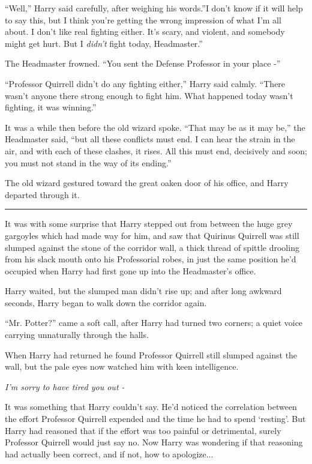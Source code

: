``Well,'' Harry said carefully, after weighing his words.''I don't know
if it will help to say this, but I think you're getting the wrong
impression of what I'm all about. I don't like real fighting either.
It's scary, and violent, and somebody might get hurt. But I
\emph{didn't} fight today, Headmaster.''

The Headmaster frowned. ``You sent the Defense Professor in your place
-''

``Professor Quirrell didn't do any fighting either,'' Harry said calmly.
``There wasn't anyone there strong enough to fight him. What happened
today wasn't fighting, it was winning.''

It was a while then before the old wizard spoke. ``That may be as it may
be,'' the Headmaster said, ``but all these conflicts must end. I can
hear the strain in the air, and with each of these clashes, it rises.
All this must end, decisively and soon; you must not stand in the way of
its ending.''

The old wizard gestured toward the great oaken door of his office, and
Harry departed through it.

\begin{center}\rule{3in}{0.4pt}\end{center}

It was with some surprise that Harry stepped out from between the huge
grey gargoyles which had made way for him, and saw that Quirinus
Quirrell was still slumped against the stone of the corridor wall, a
thick thread of spittle drooling from his slack mouth onto his
Professorial robes, in just the same position he'd occupied when Harry
had first gone up into the Headmaster's office.

Harry waited, but the slumped man didn't rise up; and after long awkward
seconds, Harry began to walk down the corridor again.

``Mr. Potter?'' came a soft call, after Harry had turned two corners; a
quiet voice carrying unnaturally through the halls.

When Harry had returned he found Professor Quirrell still slumped
against the wall, but the pale eyes now watched him with keen
intelligence.

\emph{I'm sorry to have tired you out -}

It was something that Harry couldn't say. He'd noticed the correlation
between the effort Professor Quirrell expended and the time he had to
spend `resting'. But Harry had reasoned that if the effort was too
painful or detrimental, surely Professor Quirrell would just say no. Now
Harry was wondering if that reasoning had actually been correct, and if
not, how to apologize...

